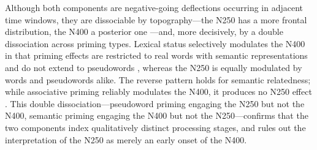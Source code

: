 Although both components are negative-going deflections occurring in adjacent time windows, they are dissociable by topography---the N250 has a more frontal distribution, the N400 a posterior one \citep{holcombTimeCourseVisual2006}---and, more decisively, by a double dissociation across priming types. Lexical status selectively modulates the N400 in that priming effects are restricted to real words with semantic representations and do not extend to pseudowords \citep{kiyonagaMaskedCrossmodalRepetition2007}, whereas the N250 is equally modulated by words and pseudowords alike. The reverse pattern holds for semantic relatedness; while associative priming reliably modulates the N400, it produces no N250 effect \citep{graingerWatchingWordGo2009}. This double dissociation---pseudoword priming engaging the N250 but not the N400, semantic priming engaging the N400 but not the N250---confirms that the two components index qualitatively distinct processing stages, and rules out the interpretation of the N250 as merely an early onset of the N400.
